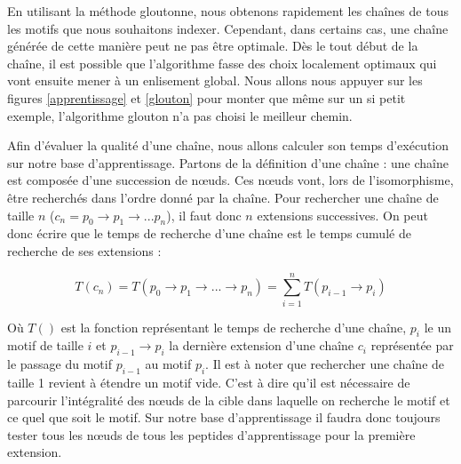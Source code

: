 \label{index_markov}

En utilisant la méthode gloutonne, nous obtenons rapidement les chaînes de tous les motifs que nous souhaitons indexer.
Cependant, dans certains cas, une chaîne générée de cette manière peut ne pas être optimale.
Dès le tout début de la chaîne, il est possible que l'algorithme fasse des choix localement optimaux qui vont ensuite mener à un enlisement global.
Nous allons nous appuyer sur les figures \ref{apprentissage} et \ref{glouton} pour monter que même sur un si petit exemple, l'algorithme glouton n'a pas choisi le meilleur chemin.

Afin d'évaluer la qualité d'une chaîne, nous allons calculer son temps d'exécution sur notre base d'apprentissage.
Partons de la définition d'une chaîne : une chaîne est composée d'une succession de n\oe{}uds.
Ces n\oe{}uds vont, lors de l'isomorphisme, être recherchés dans l'ordre donné par la chaîne.
Pour rechercher une chaîne de taille $n$ ($c_n = p_0 \rightarrow p_1 \rightarrow ... p_n$), il faut donc $n$ extensions successives.
On peut donc écrire que le temps de recherche d'une chaîne est le temps cumulé de recherche de ses extensions :

\begin{equation}
 T(c_n) = T(p_0 \rightarrow p_1 \rightarrow ... \rightarrow p_n) = \sum_{i=1}^n T(p_{i-1} \rightarrow p_i)
\end{equation}

Où $T()$ est la fonction représentant le temps de recherche d'une chaîne, $p_i$ le un motif de taille $i$ et $p_{i-1} \rightarrow p_i$ la dernière extension d'une chaîne $c_i$ représentée par le passage du motif $p_{i-1}$ au motif $p_i$.
Il est à noter que rechercher une chaîne de taille 1 revient à étendre un motif vide.
C'est à dire qu'il est nécessaire de parcourir l'intégralité des n\oe{}uds de la cible dans laquelle on recherche le motif et ce quel que soit le motif.
Sur notre base d'apprentissage il faudra donc toujours tester tous les n\oe{}uds de tous les peptides d'apprentissage pour la première extension.
% 

